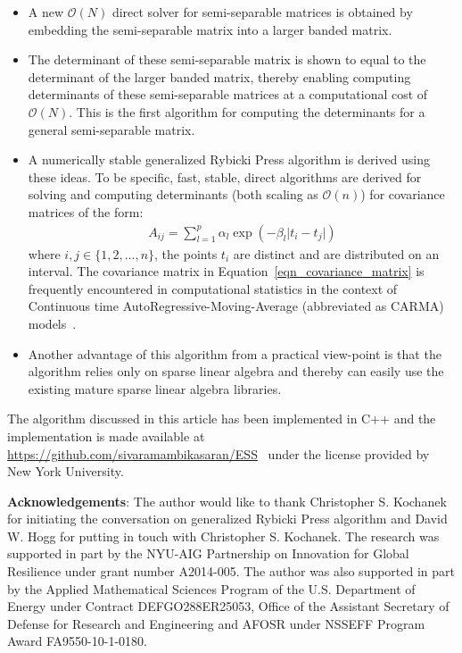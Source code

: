 \documentclass[final,leqno]{siamltex}
\begin{document}
\begin{itemize}
\item
A new $\mathcal{O}(N)$ direct solver for semi-separable matrices is obtained by embedding the semi-separable matrix into a larger banded matrix.
\item
The determinant of these semi-separable matrix is shown to equal to the determinant of the larger banded matrix, thereby enabling computing determinants of these semi-separable matrices at a computational cost of $\mathcal{O}(N)$. This is the first algorithm for computing the determinants for a general semi-separable matrix.
\item
A numerically stable generalized Rybicki Press algorithm is derived using these ideas. To be specific, fast, stable, direct algorithms are derived for solving and computing determinants (both scaling as $\mathcal{O}(n)$) for covariance matrices of the form:
\begin{align}
A_{ij} = \sum_{l=1}^p \alpha_l \exp\left(-\beta_l \vert t_i - t_j \vert\right)
\label{eqn_covariance_matrix}
\end{align}
where $i,j \in \{1,2,\ldots,n\}$, the points $t_i$ are distinct and are distributed on an interval. The covariance matrix in Equation~\eqref{eqn_covariance_matrix} is frequently encountered in computational statistics in the context of Continuous time AutoRegressive-Moving-Average (abbreviated as CARMA) models~\cite{brockwell2002introduction, brockwell2001levy, brockwell1994continuous}.
\item
Another advantage of this algorithm from a practical view-point is that the algorithm relies only on sparse linear algebra and thereby can easily use the existing mature sparse linear algebra libraries.
\end{itemize}

The algorithm discussed in this article has been implemented in C++ and the implementation is made available at \url{https://github.com/sivaramambikasaran/ESS}~\cite{ambikasaran2014ESS} under the license provided by New York University.

\textbf{Acknowledgements}: The author would like to thank Christopher S. Kochanek for initiating the conversation on generalized Rybicki Press algorithm and David W. Hogg for putting in touch with Christopher S. Kochanek. The research was supported in part by the NYU-AIG Partnership on Innovation for Global Resilience under grant number A2014-005. The author was also supported in part by the Applied Mathematical Sciences Program of the U.S. Department of Energy under Contract DEFGO288ER25053, Office of the Assistant Secretary of Defense for Research and Engineering and AFOSR under NSSEFF Program Award FA9550-10-1-0180.
\end{document}
